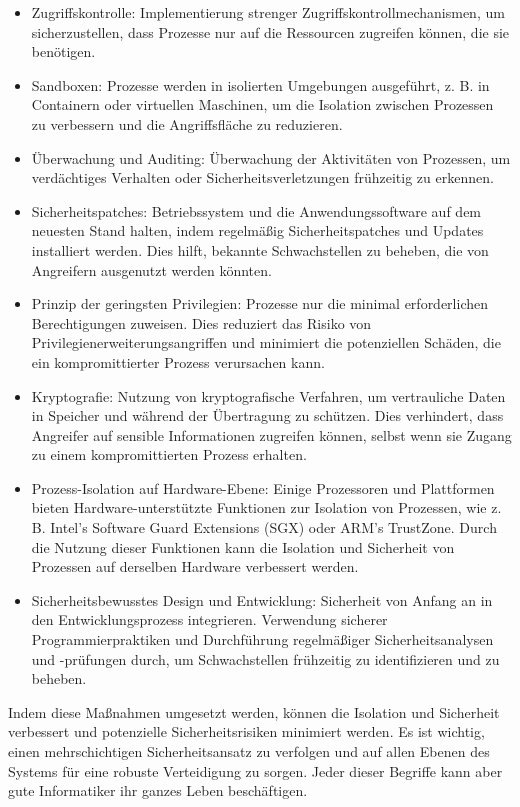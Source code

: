 \documentclass[../vs-script-first-v01.tex]{subfiles}
\begin{document}
\begin{itemize}
\item Zugriffskontrolle: Implementierung strenger Zugriffskontrollmechanismen, um sicherzustellen, dass Prozesse nur auf die Ressourcen zugreifen können, die sie benötigen.
\item Sandboxen: Prozesse werden in isolierten Umgebungen ausgeführt, z. B. in Containern oder virtuellen Maschinen, um die Isolation zwischen Prozessen zu verbessern und die Angriffsfläche zu reduzieren.
\item Überwachung und Auditing: Überwachung der Aktivitäten von Prozessen, um verdächtiges Verhalten oder Sicherheitsverletzungen frühzeitig zu erkennen.
\item Sicherheitspatches: Betriebssystem und die Anwendungssoftware auf dem neuesten Stand halten, indem regelmäßig Sicherheitspatches und Updates installiert werden. Dies hilft, bekannte Schwachstellen zu beheben, die von Angreifern ausgenutzt werden könnten.
\item Prinzip der geringsten Privilegien: Prozesse nur die minimal erforderlichen Berechtigungen zuweisen. Dies reduziert das Risiko von Privilegienerweiterungsangriffen und minimiert die potenziellen Schäden, die ein kompromittierter Prozess verursachen kann.
\item Kryptografie: Nutzung von kryptografische Verfahren, um vertrauliche Daten in Speicher und während der Übertragung zu schützen. Dies verhindert, dass Angreifer auf sensible Informationen zugreifen können, selbst wenn sie Zugang zu einem kompromittierten Prozess erhalten.
\item Prozess-Isolation auf Hardware-Ebene: Einige Prozessoren und Plattformen bieten Hardware-unterstützte Funktionen zur Isolation von Prozessen, wie z. B. Intel's Software Guard Extensions (SGX) oder ARM's TrustZone. Durch die Nutzung dieser Funktionen kann die Isolation und Sicherheit von Prozessen auf derselben Hardware verbessert werden.
\item Sicherheitsbewusstes Design und Entwicklung: Sicherheit von Anfang an in den Entwicklungsprozess integrieren. Verwendung sicherer Programmierpraktiken und Durchführung regelmäßiger Sicherheitsanalysen und -prüfungen durch, um Schwachstellen frühzeitig zu identifizieren und zu beheben.
\end{itemize}
Indem diese Maßnahmen umgesetzt werden, können die Isolation und Sicherheit verbessert und potenzielle Sicherheitsrisiken minimiert werden. Es ist wichtig, einen mehrschichtigen Sicherheitsansatz zu verfolgen und auf allen Ebenen des Systems für eine robuste Verteidigung zu sorgen. Jeder dieser Begriffe kann aber gute Informatiker ihr ganzes Leben beschäftigen. 
\end{document}
